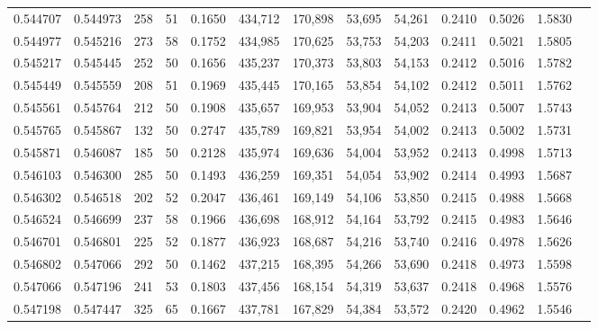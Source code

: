 \begin{tabular}{rrrrrrrrrrrrr}
0.544707 & 0.544973 &   258 &  51 &                                     0.1650 & 434,712 & 170,898 &  53,695 &  54,261 & 0.2410 & 0.5026 & 1.5830 \\
0.544977 & 0.545216 &   273 &  58 &                                     0.1752 & 434,985 & 170,625 &  53,753 &  54,203 & 0.2411 & 0.5021 & 1.5805 \\
0.545217 & 0.545445 &   252 &  50 &                                     0.1656 & 435,237 & 170,373 &  53,803 &  54,153 & 0.2412 & 0.5016 & 1.5782 \\
0.545449 & 0.545559 &   208 &  51 &                                     0.1969 & 435,445 & 170,165 &  53,854 &  54,102 & 0.2412 & 0.5011 & 1.5762 \\
0.545561 & 0.545764 &   212 &  50 &                                     0.1908 & 435,657 & 169,953 &  53,904 &  54,052 & 0.2413 & 0.5007 & 1.5743 \\
0.545765 & 0.545867 &   132 &  50 &                                     0.2747 & 435,789 & 169,821 &  53,954 &  54,002 & 0.2413 & 0.5002 & 1.5731 \\
0.545871 & 0.546087 &   185 &  50 &                                     0.2128 & 435,974 & 169,636 &  54,004 &  53,952 & 0.2413 & 0.4998 & 1.5713 \\
0.546103 & 0.546300 &   285 &  50 &                                     0.1493 & 436,259 & 169,351 &  54,054 &  53,902 & 0.2414 & 0.4993 & 1.5687 \\
0.546302 & 0.546518 &   202 &  52 &                                     0.2047 & 436,461 & 169,149 &  54,106 &  53,850 & 0.2415 & 0.4988 & 1.5668 \\
0.546524 & 0.546699 &   237 &  58 &                                     0.1966 & 436,698 & 168,912 &  54,164 &  53,792 & 0.2415 & 0.4983 & 1.5646 \\
0.546701 & 0.546801 &   225 &  52 &                                     0.1877 & 436,923 & 168,687 &  54,216 &  53,740 & 0.2416 & 0.4978 & 1.5626 \\
0.546802 & 0.547066 &   292 &  50 &                                     0.1462 & 437,215 & 168,395 &  54,266 &  53,690 & 0.2418 & 0.4973 & 1.5598 \\
0.547066 & 0.547196 &   241 &  53 &                                     0.1803 & 437,456 & 168,154 &  54,319 &  53,637 & 0.2418 & 0.4968 & 1.5576 \\
0.547198 & 0.547447 &   325 &  65 &                                     0.1667 & 437,781 & 167,829 &  54,384 &  53,572 & 0.2420 & 0.4962 & 1.5546 \\

\end{tabular}
